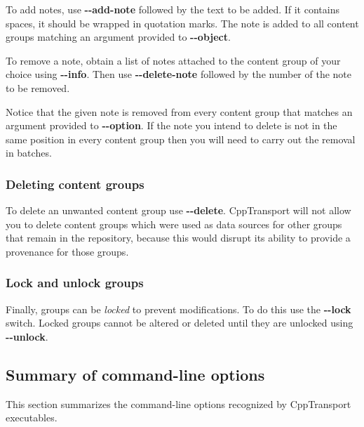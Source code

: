 \documentclass[11pt,a4paper]{article}
\newenvironment{warning}{\begin{tcolorbox}[enhanced,breakable,colback=red!10,colbacktitle=red!20,colframe=red!40,coltitle=black,title={Warning},fonttitle=\sffamily\fontseries{b}\selectfont]}{\end{tcolorbox}}
\newcommand{\packagefont}{\sffamily}
\newcommand{\CppTransport}{{\packagefont CppTransport}}
\newcommand{\option}[1]{{\ttfamily\bfseries\small #1}}
\begin{document}
To add notes, use
\option{{-}{-}add-note}
followed by the text to be added.
If it contains spaces, it should be wrapped in quotation marks.
The note is added to all content groups matching an argument provided
to \option{{-}{-}object}.

To remove a note, obtain a list of notes attached to the content group of your
choice using \option{{-}{-}info}.
Then use \option{{-}{-}delete-note} followed by the number of the note to be
removed.

\begin{warning}
    Notice that the given note is removed from every content group that matches
    an argument provided to \option{{-}{-}option}. If the note you intend to delete
    is not in the same position in every content group then you will need to carry out
    the removal in batches.    
\end{warning}

\subsubsection{Deleting content groups}
\label{sec:delete-content}

To delete an unwanted content group use \option{{-}{-}delete}.
{\CppTransport} will not allow you to delete content groups which were used
as data sources for other groups that remain in the repository,
because this would disrupt its ability to provide a provenance for those groups.

\subsubsection{Lock and unlock groups}
\label{sec:lock-unlock}

Finally, groups can be \emph{locked} to prevent modifications. To do this use the
\option{{-}{-}lock} switch.
Locked groups cannot be altered or deleted until they are unlocked using
\option{{-}{-}unlock}.

\subsection{Summary of command-line options}
This section summarizes the command-line
options recognized by {\CppTransport} executables.
\vspace{3mm}
\end{document}
